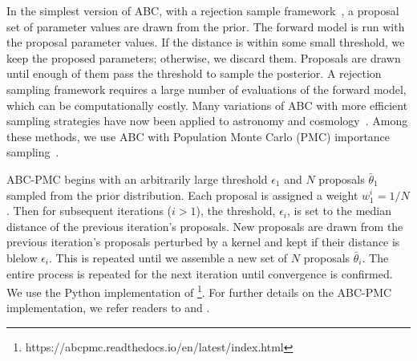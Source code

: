 In the simplest version of ABC, with a rejection sample
framework~\citep{pritchard1999}, a proposal set of parameter values are drawn
from the prior. The forward model is run with the proposal parameter values.
If the distance is within some small threshold, we keep the proposed
parameters; otherwise, we discard them.  Proposals are
drawn until enough of them pass the threshold to sample the posterior. A
rejection sampling framework requires a large number of evaluations of the
forward model, which
can be computationally costly. Many variations of ABC with more efficient
sampling strategies have now been applied to astronomy and
cosmology~\citep[\eg][]{cameron2012, weyant2013, ishida2015, lin2016, alsing2018}.
Among these methods, we use ABC with Population Monte Carlo (PMC) 
importance sampling~\citep{hahn2017a, hahn2017b, hahn2019a}.

ABC-PMC begins with an arbitrarily large threshold $\epsilon_1$ and $N$ proposals 
$\bar{\theta}_1$ sampled from the prior distribution. Each proposal is
assigned a weight $w^i_1 = 1/N$. Then for subsequent iterations ($i > 1$), the 
threshold, $\epsilon_i$, is set to the median distance of the previous iteration's
proposals. New proposals are drawn from the previous iteration's proposals perturbed 
by a kernel and kept if their distance is blelow $\epsilon_i$. This is repeated
until we assemble a new set of $N$ proposals $\bar{\theta}_i$. The entire
process is repeated for the next iteration until convergence is confirmed. 
We use the Python implementation of
\cite{akeret2015}\footnote{https://abcpmc.readthedocs.io/en/latest/index.html}.
For further details on the ABC-PMC implementation, we refer readers to \cite{hahn2017b}
and \cite{hahn2019a}.

